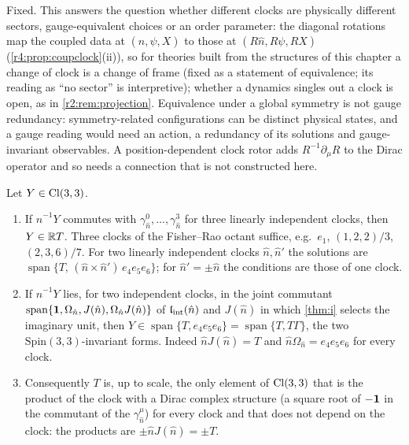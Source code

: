 Fixed. This answers the question whether different clocks are physically different sectors, gauge-equivalent
choices or an order parameter: the diagonal rotations map the coupled data at $(\hat n,\psi,X)$ to those at $(R\hat n,R\psi,RX)$ (\cref{r4:prop:coupclock}(ii)), so for
theories built from the structures of this chapter a change of clock is a change of frame (fixed as a statement of equivalence; its reading as ``no
sector'' is interpretive); whether a dynamics singles out a clock is open, as in \cref{r2:rem:projection}. Equivalence under a global symmetry is
not gauge redundancy: symmetry-related configurations can be distinct physical states, and a gauge reading would need an action, a
redundancy of its solutions and gauge-invariant observables. A position-dependent clock rotor adds $R^{-1}\partial_\mu R$ to the Dirac operator and
so needs a connection that is not constructed here.

\begin{theorem}[Uniqueness of $T$]
\label{r4:thm:unique}
Let $Y\in\mathrm{Cl}(3,3)$.
\begin{enumerate}[label=(\roman*),leftmargin=2.2em]
\item If $\hat n^{-1}Y$ commutes with $\gamma^0_{\hat n},\dots,\gamma^3_{\hat n}$ for three linearly independent clocks, then $Y\in\mathbb{R} T$. Three clocks of the Fisher--Rao octant suffice,
e.g.\ $e_1$, $(1,2,2)/3$, $(2,3,6)/7$. For two linearly independent clocks $\hat n,\hat n'$ the solutions are $\operatorname{span}\{T,\,(\hat n\times \hat n')\,e_4e_5e_6\}$; for $\hat n'=\pm\hat n$ the
conditions are those of one clock.
\item If $\hat n^{-1}Y$ lies, for two independent clocks, in the joint commutant $\operatorname{span}\{\mathbf 1,\Omega_{\hat n},J(\hat n),\Omega_{\hat n}J(\hat n)\}$ of $\mathfrak l_{\rm int}(\hat n)$ and $J(\hat n)$ in which \cref{thm:i} selects the imaginary unit, then $Y\in\operatorname{span}\{T,e_4e_5e_6\}=\operatorname{span}\{T,T\Gamma\}$, the two $\mathrm{Spin}(3,3)$-invariant forms. Indeed $\hat nJ(\hat n)=T$ and
$\hat n\Omega_{\hat n}=e_4e_5e_6$ for every clock.
\item Consequently $T$ is, up to scale, the only element of $\mathrm{Cl}(3,3)$ that is the product of the clock with a Dirac complex structure (a square root of $-\mathbf 1$ in
the commutant of the $\gamma^\mu_{\hat n}$) for every clock and that does not depend on the clock: the products are $\pm \hat nJ(\hat n)=\pm T$.
\end{enumerate}
\end{theorem}

